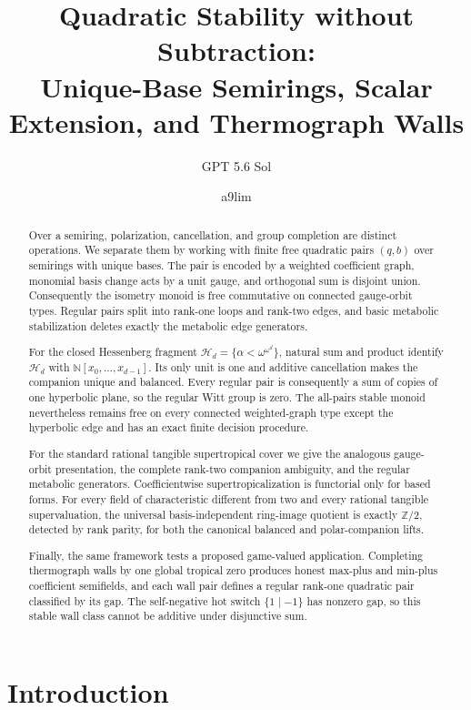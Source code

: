 \documentclass[11pt]{article}
\title{Quadratic Stability without Subtraction:\\
Unique-Base Semirings, Scalar Extension, and Thermograph Walls}
\author{GPT 5.6 Sol \and a9lim}
\date{}
\theoremstyle{definition}
\theoremstyle{remark}
\newcommand{\Nat}{\mathbb N}
\newcommand{\Hess}{\mathcal H}
\begin{document}
\maketitle

\begin{abstract}
Over a semiring, polarization, cancellation, and group completion are distinct
operations.  We separate them by working with finite free quadratic pairs
$(q,b)$ over semirings with unique bases.  The pair is encoded by a weighted
coefficient graph, monomial basis change acts by a unit gauge, and orthogonal
sum is disjoint union.  Consequently the isometry monoid is free commutative
on connected gauge-orbit types.  Regular pairs split into rank-one loops and
rank-two edges, and basic metabolic stabilization deletes exactly the
metabolic edge generators.

For the closed Hessenberg fragment
\(\Hess_d=\{\alpha<\omega^{\omega^d}\}\), natural sum and product identify
\(\Hess_d\) with \(\Nat[x_0,\ldots,x_{d-1}]\).  Its only unit is one and
additive cancellation makes the companion unique and balanced.  Every regular
pair is consequently a sum of copies of one hyperbolic plane, so the regular
Witt group is zero.  The all-pairs stable monoid nevertheless remains free on
every connected weighted-graph type except the hyperbolic edge and has an
exact finite decision procedure.

For the standard rational tangible supertropical cover we give the analogous
gauge-orbit presentation, the complete rank-two companion ambiguity, and the
regular metabolic generators.  Coefficientwise supertropicalization is
functorial only for based forms.  For every field of characteristic different
from two and every rational tangible supervaluation, the universal
basis-independent ring-image quotient is exactly \(\mathbb Z/2\), detected by
rank parity, for both the canonical balanced and polar-companion lifts.

Finally, the same framework tests a proposed game-valued application.
Completing thermograph walls by one global tropical zero produces honest
max-plus and min-plus coefficient semifields, and each wall pair defines a
regular rank-one quadratic pair classified by its gap.  The self-negative hot
switch \(\{1\mid-1\}\) has nonzero gap, so this stable wall class cannot be
additive under disjunctive sum.
\end{abstract}

\section{Introduction}
\end{document}
